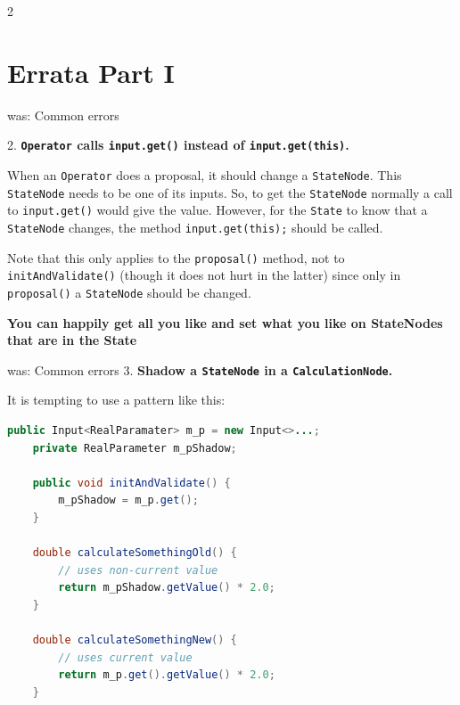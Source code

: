 \documentclass{beamer}
\def\part{3}
\theoremstyle{definition}
\begin{document}
\fi
\if \part 2



\section{Errata Part I}

\begin{frame}{was: Common errors}

2. {\bf\color{red} { \tt Operator} calls {\tt input.get()} instead of {\tt input.get(this)}.}

When an {\tt Operator} does a proposal, it should change a {\tt StateNode}.
This {\tt StateNode} needs to be one of its inputs. So, to get the {\tt StateNode}
normally a call to {\tt input.get()} would give the value. However, for the
{\tt State} to know that a {\tt StateNode} changes, the method {\tt input.get(this);}
should be called.

Note that this only applies to the {\tt proposal()} method, not to {\tt initAndValidate()}
(though it does not hurt in the latter) since only in {\tt proposal()} a {\tt StateNode}
should be changed.
\pause
{}\vskip0.5cm

{\bf\color{green}You can happily get all you like  
\color{red} and set what you like on StateNodes that are in the State}

\end{frame}

\begin{frame}[containsverbatim]{was: Common errors}
3. {\bf\color{red} Shadow a {\tt StateNode} in a {\tt CalculationNode}.}

It is tempting to use a pattern like this:

\color{blue}\begin{lstlisting}[language=java]
public Input<RealParamater> m_p = new Input<>...;
    private RealParameter m_pShadow;

    public void initAndValidate() {
        m_pShadow = m_p.get();
    }
    
    double calculateSomethingOld() {
        // uses non-current value
        return m_pShadow.getValue() * 2.0;
    }

    double calculateSomethingNew() {
        // uses current value
        return m_p.get().getValue() * 2.0;
    }
\end{lstlisting}
\end{frame}
\end{document}

